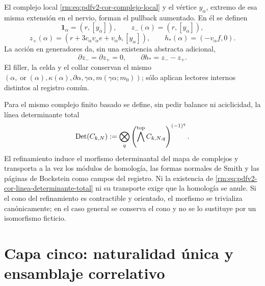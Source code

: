 El complejo local \eqref{rm:eq:pdfv2-cor-complejo-local} y el vértice
\(y_\alpha\), extremo de esa misma extensión en el nervio, forman el pullback
aumentado. En él se definen
\begin{equation}
\label{rm:eq:pdfv2-cor-zpm-h}
 \mathbf1_\alpha=(r,[y_\alpha]),\qquad
 z_-(\alpha)=(r,[y_\alpha]),
\end{equation}
\begin{equation}
\label{rm:eq:pdfv2-cor-zplus-h}
 z_+(\alpha)=
 (r+3c_\alpha v_\alpha e+v_\alpha b,[y_\alpha]),
 \qquad
 h_*(\alpha)=(-v_\alpha f,0).
\end{equation}
La acción en generadores da, sin una existencia abstracta adicional,
\begin{equation}
\label{rm:eq:pdfv2-cor-filler}
 \partial z_-=\partial z_+=0,\qquad
 \partial h_*=z_--z_+.
\end{equation}
El filler, la celda y el collar conservan el mismo
\((\alpha,\operatorname{or}(\alpha),\kappa(\alpha),\partial\alpha,
\gamma\alpha,m(\gamma\alpha;m_0))\); sólo aplican lectores internos distintos
al registro común.

Para el mismo complejo finito basado se define, sin pedir balance ni
aciclicidad, la línea determinante total
\begin{equation}
\label{rm:eq:pdfv2-cor-linea-determinante-total}
 \operatorname{Det}(C_{k,N}):=
 \bigotimes_q
 \left(\bigwedge^{\rm top}C_{k,N,q}\right)^{(-1)^q}.
\end{equation}
El refinamiento induce el morfismo determinantal del mapa de complejos y
transporta a la vez los módulos de homología, las formas normales de Smith y
las páginas de Bockstein como campos del registro. Ni la existencia de
\eqref{rm:eq:pdfv2-cor-linea-determinante-total} ni su transporte exige que la
homología se anule. Si el cono del refinamiento es contractible y orientado,
el morfismo se trivializa canónicamente; en el caso general se conserva el
cono y no se lo sustituye por un isomorfismo ficticio.

\section{Capa cinco: naturalidad única y ensamblaje correlativo}

